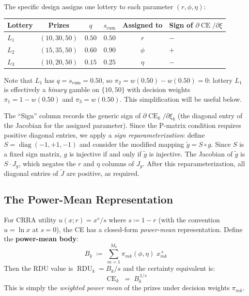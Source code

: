 \documentclass[11pt,a4paper]{article}
\theoremstyle{definition}
\DeclareMathOperator{\CE}{CE}
\DeclareMathOperator{\RDU}{RDU}
\DeclareMathOperator{\diag}{diag}
\begin{document}
The specific design assigns one lottery to each parameter
$(r, \phi, \eta)$:
\begin{center}
\begin{tabular}{lccccl}
    Lottery & Prizes & $q$ & $s_{\mathrm{cum}}$ & Assigned to & Sign of $\partial\CE/\partial\xi$ \\
    \hline
    $L_1$ & $(10, 30, 50)$ & $0.50$ & $0.50$ & $r$ & $-$ \\
    $L_2$ & $(15, 35, 50)$ & $0.60$ & $0.90$ & $\phi$ & $+$ \\
    $L_3$ & $(10, 20, 50)$ & $0.15$ & $0.25$ & $\eta$ & $-$
\end{tabular}
\end{center}

\noindent
Note that $L_1$ has $q = s_{\mathrm{cum}} = 0.50$, so $\pi_2 = w(0.50) - w(0.50) = 0$:
lottery $L_1$ is effectively a \emph{binary} gamble on $\{10, 50\}$ with
decision weights $\pi_1 = 1 - w(0.50)$ and $\pi_3 = w(0.50)$.
This simplification will be useful below.

The ``Sign'' column records the generic sign of $\partial\CE_k/\partial\xi_k$
(the diagonal entry of the Jacobian for the assigned parameter).
Since the P-matrix condition requires positive diagonal entries, we
apply a \emph{sign reparameterization}: define $S = \diag(-1, +1, -1)$
and consider the modified mapping $\tilde{g} = S \circ g$. Since $S$ is
a fixed sign matrix, $g$ is injective if and only if $\tilde{g}$ is
injective. The Jacobian of $\tilde{g}$ is $S \cdot J_g$, which negates
the $r$ and $\eta$ columns of $J_g$. After this reparameterization, all
diagonal entries of $\widetilde{J}$ are positive, as required.

\subsection{The Power-Mean Representation}
\label{sec:power_mean}

For CRRA utility $u(x;r) = x^s/s$ where $s \coloneqq 1 - r$
(with the convention $u = \ln x$ at $s = 0$), the CE has a
closed-form \emph{power-mean} representation.
Define the \textbf{power-mean body}:
\begin{equation}
    \label{eq:B_def}
    B_k \;\coloneqq\; \sum_{m=1}^{M_k} \pi_{mk}(\phi,\eta)\; x_{mk}^{\,s}
\end{equation}
Then the RDU value is $\RDU_k = B_k / s$ and the certainty equivalent is:
\begin{equation}
    \label{eq:CE_power}
    \CE_k \;=\; B_k^{\,1/s}
\end{equation}
This is simply the \emph{weighted power mean} of the prizes under
decision weights $\pi_{mk}$.
\end{document}
